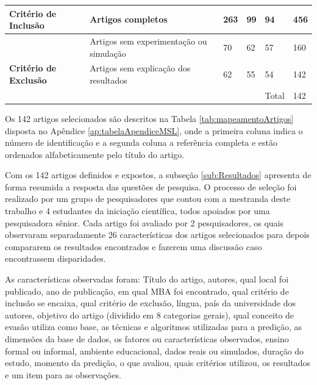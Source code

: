 \begin{table}[H]
{\begin{tabular}{llllll}
\multicolumn{1}{|l|}{\multirow{-5}{*}{\cellcolor[HTML]{C0C0C0}\textbf{Critério de Inclusão}}} & \multicolumn{1}{l|}{Artigos completos}                       & \multicolumn{1}{l|}{263} & \multicolumn{1}{l|}{99}  & \multicolumn{1}{l|}{94}  & \multicolumn{1}{l|}{456} \\ \hline
\multicolumn{1}{|l|}{\cellcolor[HTML]{C0C0C0}}                                                & \multicolumn{1}{l|}{Artigos sem experimentação ou simulação} & \multicolumn{1}{l|}{70}  & \multicolumn{1}{l|}{62}  & \multicolumn{1}{l|}{57}  & \multicolumn{1}{l|}{160} \\ \cline{2-6} 
\multicolumn{1}{|l|}{\multirow{-2}{*}{\cellcolor[HTML]{C0C0C0}\textbf{Critério de Exclusão}}} & \multicolumn{1}{l|}{Artigos sem explicação dos resultados}   & \multicolumn{1}{l|}{62}  & \multicolumn{1}{l|}{55}  & \multicolumn{1}{l|}{54}  & \multicolumn{1}{l|}{142} \\ \hline
                                                                                              &                                                              &                          &                          & Total                    & 142                     
\end{tabular}%
}
\end{table}

Os 142 artigos selecionados são descritos na Tabela \ref{tab:mapeamentoArtigos} disposta no Apêndice \ref{ap:tabelaApendiceMSL}, onde a primeira coluna indica o número de identificação e a segunda coluna a referência completa e estão ordenados alfabeticamente pelo título do artigo.


Com os 142 artigos definidos e expostos, a subseção \ref{sub:Resultados} apresenta de forma resumida a resposta das questões de pesquisa. O processo de seleção foi realizado por um grupo de pesquisadores que contou com a mestranda deste trabalho e 4 estudantes da iniciação científica, todos apoiados por uma pesquisadora sênior. Cada artigo foi avaliado por 2 pesquisadores, os quais observaram separadamente 26 características dos artigos selecionados para depois compararem os resultados encontrados e fazerem uma discussão caso encontrassem disparidades. 

As características observadas foram: Título do artigo, autores, qual local foi publicado, ano de publicação, em qual MBA foi encontrado, qual critério de inclusão se encaixa, qual critério de exclusão, língua, país da universidade dos autores, objetivo do artigo (dividido em 8 categorias gerais), qual conceito de evasão utiliza como base, as técnicas e algoritmos utilizadas para a predição, as dimensões da base de dados, os fatores ou características observados, ensino formal ou informal, ambiente educacional, dados reais ou simulados, duração do estudo, momento da predição, o que avaliou, quais critérios utilizou, os resultados e um item para as observações.


